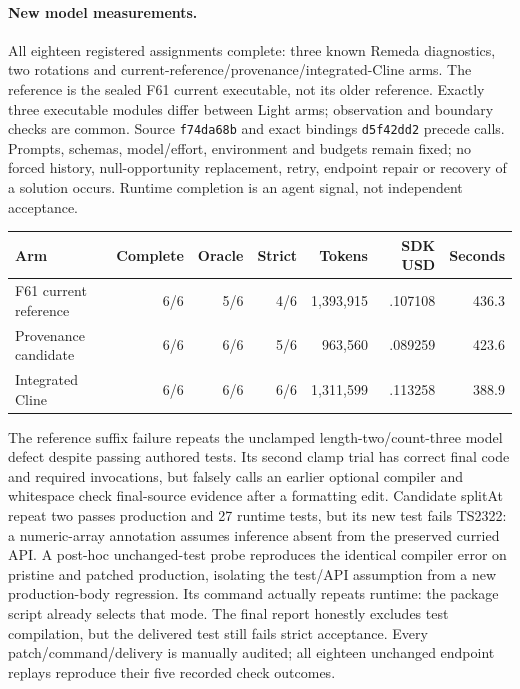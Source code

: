 \documentclass[11pt,a4paper]{article}
\newcommand{\code}[1]{\texttt{\detokenize{#1}}}
\begin{document}
\paragraph{New model measurements.}
All eighteen registered assignments complete: three known Remeda diagnostics,
two rotations and current-reference/provenance/integrated-Cline arms. The reference
is the sealed F61 current executable, not its older reference. Exactly three
executable modules differ between Light arms; observation and boundary checks are
common. Source \texttt{f74da68b} and exact bindings \texttt{d5f42dd2} precede calls.
Prompts, schemas, model/effort, environment and budgets remain fixed; no forced
history, null-opportunity replacement, retry, endpoint repair or recovery of a
solution occurs. Runtime completion is an agent signal, not independent acceptance.

\begin{center}\small
\begin{tabular}{lrrrrrr}\toprule
Arm & Complete & Oracle & Strict & Tokens & SDK USD & Seconds \\\midrule
F61 current reference & 6/6 & 5/6 & 4/6 & 1,393,915 & .107108 & 436.3 \\
Provenance candidate & 6/6 & 6/6 & 5/6 & 963,560 & .089259 & 423.6 \\
Integrated Cline & 6/6 & 6/6 & 6/6 & 1,311,599 & .113258 & 388.9 \\\bottomrule
\end{tabular}
\end{center}
The reference suffix failure repeats the unclamped length-two/count-three model
defect despite passing authored tests. Its second clamp trial has correct final
code and required invocations, but falsely calls an earlier optional compiler
and whitespace check final-source evidence after a formatting edit. Candidate
splitAt repeat two passes production and 27 runtime tests, but its new test fails
TS2322: a numeric-array annotation assumes inference absent from the preserved
curried API. A post-hoc unchanged-test probe reproduces the identical compiler
error on pristine and patched production, isolating the test/API assumption from
a new production-body regression. Its \code{test:study:delivered -- types} command
actually repeats runtime: the package script already selects that mode. The final
report honestly excludes test compilation, but the delivered test still fails
strict acceptance. Every patch/command/delivery is manually audited; all eighteen
unchanged endpoint replays reproduce their five recorded check outcomes.
\end{document}
